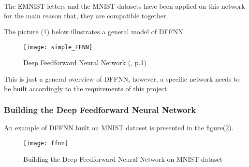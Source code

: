 \noindent
The EMNIST-letters and the MNIST datasets have been applied on this network for the main reason that, they are compatible together. \hfill \break

\noindent
The picture (\ref{Abb:feed_forward}) below illustrates a general model of DFFNN.

\begin{figure}[htb]
	\centering
	\texttt{[image: simple\_FFNN]}
	\caption[Deep Feedforward Neural Network]{Deep Feedforward Neural Network (\cite{[3]}, p.1)}\label{Abb:feed_forward}
\end{figure}

\noindent
This is just a general overview of DFFNN, however, a specific network needs to be built accordingly to 
the requirements of this project. \hfill \break

\subsubsection{Building the Deep Feedforward Neural Network}
An example of DFFNN built on MNIST dataset is presented in the figure(\ref{Abb:build_feed_forward}).

\begin{figure}[htb]
	\centering
	\texttt{[image: ffnn]}
	\caption[Build Deep Feedforward Neural Network]{Building the Deep Feedforward Neural Network on MNIST dataset} \label{Abb:build_feed_forward}
\end{figure}

